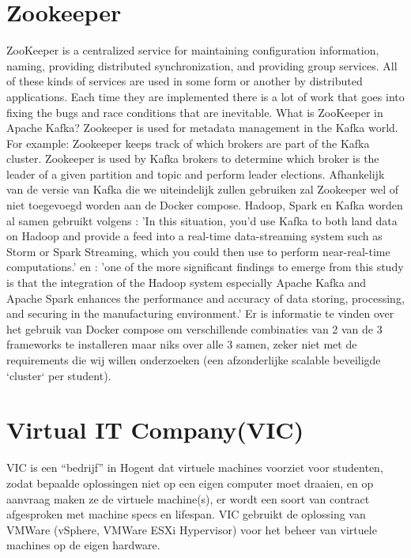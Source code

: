 \section{Zookeeper}
ZooKeeper is a centralized service for maintaining configuration information, naming, providing distributed synchronization, and providing group services. All of these kinds of services are used in some form or another by distributed applications. Each time they are implemented there is a lot of work that goes into fixing the bugs and race conditions that are inevitable.\autocite{ASF2023}
\newline
\newline 
What is ZooKeeper in Apache Kafka?
Zookeeper is used for metadata management in the Kafka world. For example: Zookeeper keeps track of which brokers are part of the Kafka cluster. Zookeeper is used by Kafka brokers to determine which broker is the leader of a given partition and topic and perform leader elections. \autocite{Conduktor2023}
\newline
\newline
Afhankelijk van de versie van Kafka die we uiteindelijk zullen gebruiken zal Zookeeper wel of niet toegevoegd worden aan de Docker compose.
\newline
\newline
\newline
\newline
\newline
Hadoop, Spark en Kafka worden al samen gebruikt volgens \textcite{Holmes2012}:
'In this situation, you'd use Kafka to both land data on Hadoop and provide a feed into a real-time data-streaming system such as Storm or Spark Streaming, which you could then use to perform near-real-time computations.' en \textcite{Leang2019}:
'one of the more significant findings to emerge from this study is that the integration of the Hadoop system especially Apache Kafka and Apache Spark enhances the performance and accuracy of data storing, processing, and securing in the manufacturing environment.'
\newline
\newline
Er is informatie te vinden over het gebruik van Docker compose om verschillende combinaties van 2 van de 3 frameworks te installeren maar niks over alle 3 samen, zeker niet met de requirements die wij willen onderzoeken (een afzonderlijke scalable beveiligde `cluster` per student).



\section{Virtual IT Company(VIC)}
VIC is een ``bedrijf'' in Hogent dat virtuele machines voorziet voor studenten, zodat bepaalde oplossingen niet op een eigen computer moet draaien, en op aanvraag maken ze de virtuele machine(s), er wordt een soort van contract afgesproken met machine specs en lifespan.
\newline
\newline
VIC gebruikt de oplossing van VMWare (vSphere, VMWare ESXi Hypervisor) voor het beheer van virtuele machines op de eigen hardware.

